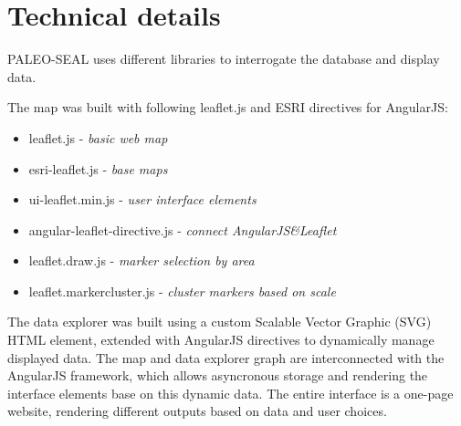 \documentclass[a4paper,fleqn]{cas-dc}
\begin{document}
\section{Technical details}
PALEO-SEAL uses different libraries to interrogate the database and display data. 

The map was built with following leaflet.js and ESRI directives for AngularJS:
\begin{itemize}
	\item leaflet.js - \textit{basic web map}
	\item esri-leaflet.js - \textit{base maps}
	\item ui-leaflet.min.js - \textit{user interface elements}
	\item angular-leaflet-directive.js - \textit{connect AngularJS\&Leaflet}
	\item leaflet.draw.js - \textit{marker selection by area }
	\item leaflet.markercluster.js - \textit{cluster markers based on scale }
\end{itemize}

The data explorer was built using a custom Scalable Vector Graphic (SVG) HTML element, extended with AngularJS directives to dynamically manage displayed data. The map and data explorer graph are interconnected with the AngularJS framework, which allows asyncronous storage and rendering the interface elements base on this dynamic data. The entire interface is a one-page website, rendering different outputs based on data and user choices. 
\end{document}
